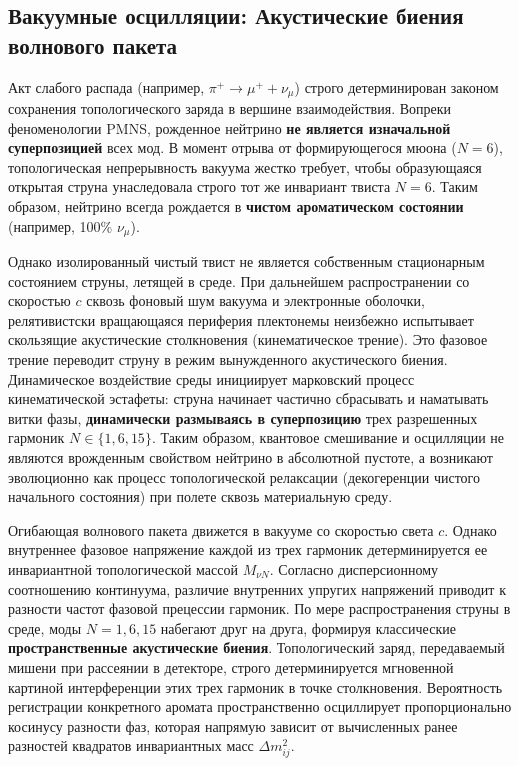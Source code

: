 \documentclass[11pt,a4paper]{article}
\begin{document}
	\subsection{Вакуумные осцилляции: Акустические биения волнового пакета}
	Акт слабого распада (например, $\pi^+ \to \mu^+ + \nu_\mu$) строго детерминирован законом сохранения топологического заряда в вершине взаимодействия. Вопреки феноменологии PMNS, рожденное нейтрино \textbf{не является изначальной суперпозицией} всех мод. 
	В момент отрыва от формирующегося мюона ($N=6$), топологическая непрерывность вакуума жестко требует, чтобы образующаяся открытая струна унаследовала строго тот же инвариант твиста $N=6$. Таким образом, нейтрино всегда рождается в \textbf{чистом ароматическом состоянии} (например, 100\% $\nu_\mu$).
	
	Однако изолированный чистый твист не является собственным стационарным состоянием струны, летящей в среде. При дальнейшем распространении со скоростью $c$ сквозь фоновый шум вакуума и электронные оболочки, релятивистски вращающаяся периферия плектонемы неизбежно испытывает скользящие акустические столкновения (кинематическое трение). 
	Это фазовое трение переводит струну в режим вынужденного акустического биения. Динамическое воздействие среды инициирует марковский процесс кинематической эстафеты: струна начинает частично сбрасывать и наматывать витки фазы, \textbf{динамически размываясь в суперпозицию} трех разрешенных гармоник $N \in \{1, 6, 15\}$. 
	Таким образом, квантовое смешивание и осцилляции не являются врожденным свойством нейтрино в абсолютной пустоте, а возникают эволюционно как процесс топологической релаксации (декогеренции чистого начального состояния) при полете сквозь материальную среду.
	
	Огибающая волнового пакета движется в вакууме со скоростью света $c$. Однако внутреннее фазовое напряжение каждой из трех гармоник детерминируется ее инвариантной топологической массой $M_{\nu N}$. Согласно дисперсионному соотношению континуума, различие внутренних упругих напряжений приводит к разности частот фазовой прецессии гармоник.
	По мере распространения струны в среде, моды $N=1, 6, 15$ набегают друг на друга, формируя классические \textbf{пространственные акустические биения}. 
	Топологический заряд, передаваемый мишени при рассеянии в детекторе, строго детерминируется мгновенной картиной интерференции этих трех гармоник в точке столкновения. Вероятность регистрации конкретного аромата пространственно осциллирует пропорционально косинусу разности фаз, которая напрямую зависит от вычисленных ранее разностей квадратов инвариантных масс $\Delta m^2_{ij}$. 
	
\end{document}
